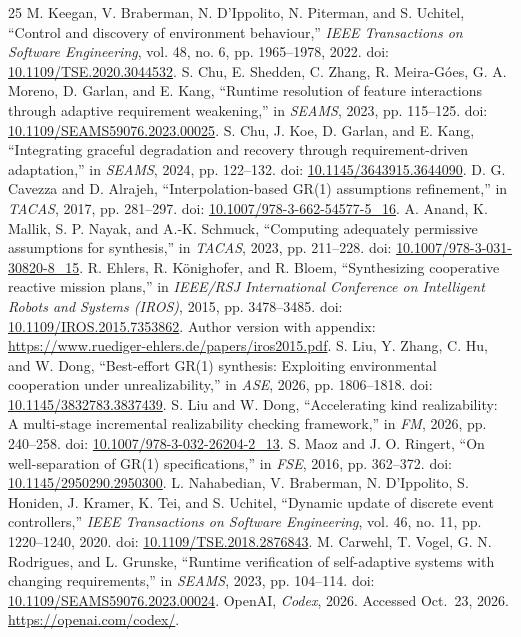 \begin{thebibliography}{25}
M. Keegan, V. Braberman, N. D'Ippolito, N. Piterman, and S. Uchitel, ``Control and discovery of environment behaviour,'' \emph{IEEE Transactions on Software Engineering}, vol. 48, no. 6, pp. 1965--1978, 2022. doi: \href{https://doi.org/10.1109/TSE.2020.3044532}{10.1109/TSE.2020.3044532}.
S. Chu, E. Shedden, C. Zhang, R. Meira-G\'oes, G. A. Moreno, D. Garlan, and E. Kang, ``Runtime resolution of feature interactions through adaptive requirement weakening,'' in \emph{SEAMS}, 2023, pp. 115--125. doi: \href{https://doi.org/10.1109/SEAMS59076.2023.00025}{10.1109/SEAMS59076.2023.00025}.
S. Chu, J. Koe, D. Garlan, and E. Kang, ``Integrating graceful degradation and recovery through requirement-driven adaptation,'' in \emph{SEAMS}, 2024, pp. 122--132. doi: \href{https://doi.org/10.1145/3643915.3644090}{10.1145/3643915.3644090}.
D. G. Cavezza and D. Alrajeh, ``Interpolation-based GR(1) assumptions refinement,'' in \emph{TACAS}, 2017, pp. 281--297. doi: \href{https://doi.org/10.1007/978-3-662-54577-5_16}{10.1007/978-3-662-54577-5\_16}.
A. Anand, K. Mallik, S. P. Nayak, and A.-K. Schmuck, ``Computing adequately permissive assumptions for synthesis,'' in \emph{TACAS}, 2023, pp. 211--228. doi: \href{https://doi.org/10.1007/978-3-031-30820-8_15}{10.1007/978-3-031-30820-8\_15}.
R. Ehlers, R. K\"onighofer, and R. Bloem, ``Synthesizing cooperative reactive mission plans,'' in \emph{IEEE/RSJ International Conference on Intelligent Robots and Systems (IROS)}, 2015, pp. 3478--3485. doi: \href{https://doi.org/10.1109/IROS.2015.7353862}{10.1109/IROS.2015.7353862}. Author version with appendix: \url{https://www.ruediger-ehlers.de/papers/iros2015.pdf}.
S. Liu, Y. Zhang, C. Hu, and W. Dong, ``Best-effort GR(1) synthesis: Exploiting environmental cooperation under unrealizability,'' in \emph{ASE}, 2026, pp. 1806--1818. doi: \href{https://doi.org/10.1145/3832783.3837439}{10.1145/3832783.3837439}.
S. Liu and W. Dong, ``Accelerating kind realizability: A multi-stage incremental realizability checking framework,'' in \emph{FM}, 2026, pp. 240--258. doi: \href{https://doi.org/10.1007/978-3-032-26204-2_13}{10.1007/978-3-032-26204-2\_13}.
S. Maoz and J. O. Ringert, ``On well-separation of GR(1) specifications,'' in \emph{FSE}, 2016, pp. 362--372. doi: \href{https://doi.org/10.1145/2950290.2950300}{10.1145/2950290.2950300}.
L. Nahabedian, V. Braberman, N. D'Ippolito, S. Honiden, J. Kramer, K. Tei, and S. Uchitel, ``Dynamic update of discrete event controllers,'' \emph{IEEE Transactions on Software Engineering}, vol. 46, no. 11, pp. 1220--1240, 2020. doi: \href{https://doi.org/10.1109/TSE.2018.2876843}{10.1109/TSE.2018.2876843}.
M. Carwehl, T. Vogel, G. N. Rodrigues, and L. Grunske, ``Runtime verification of self-adaptive systems with changing requirements,'' in \emph{SEAMS}, 2023, pp. 104--114. doi: \href{https://doi.org/10.1109/SEAMS59076.2023.00024}{10.1109/SEAMS59076.2023.00024}.
OpenAI, \emph{Codex}, 2026. Accessed Oct.~23, 2026. \url{https://openai.com/codex/}.
\end{thebibliography}
